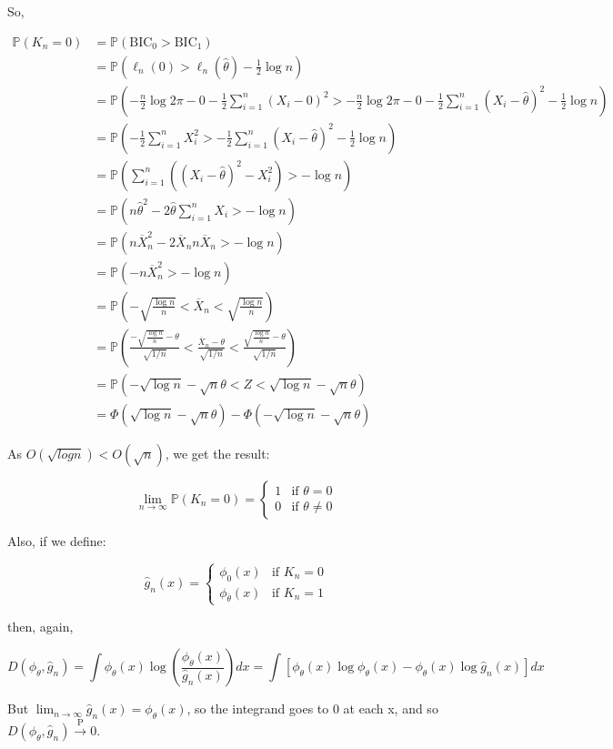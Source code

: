 So,

\begin{align}
\mathbb{P}(K_n = 0) &= \mathbb{P}(\text{BIC}_0 > \text{BIC}_1) \\
&= \mathbb{P}\left(\ell_n(0) > \ell_n(\hat{\theta}) - \frac{1}{2} \log n \right) \\
&= \mathbb{P} \left(-\frac{n}{2} \log 2\pi - 0 - \frac{1}{2} \sum_{i=1}^n (X_i - 0)^2 > -\frac{n}{2} \log 2\pi - 0 - \frac{1}{2} \sum_{i=1}^n (X_i - \hat{\theta})^2 - \frac{1}{2} \log n \right) \\
&= \mathbb{P}\left( -\frac{1}{2} \sum_{i=1}^n X_i^2 > -\frac{1}{2} \sum_{i=1}^n (X_i - \hat{\theta})^2 - \frac{1}{2} \log n\right) \\
&= \mathbb{P}\left( \sum_{i=1}^n \left((X_i - \hat{\theta})^2 - X_i^2 \right) > -\log n \right) \\
&= \mathbb{P}\left( n \hat{\theta}^2 - 2 \hat{\theta} \sum_{i=1}^n X_i > -\log n \right) \\
&= \mathbb{P}\left( n \overline{X}_n^2 - 2 \overline{X}_n n \overline{X}_n > -\log n\right) \\
&= \mathbb{P}\left( -n \overline{X}_n^2 > -\log n \right) \\
&= \mathbb{P}\left(-\sqrt{\frac{\log n}{n}} < \overline{X}_n < \sqrt{\frac{\log n}{n}} \right) \\
&= \mathbb{P}\left(\frac{-\sqrt{\frac{\log n}{n}} - \theta}{\sqrt{1/n}} < \frac{\overline{X}_n - \theta}{\sqrt{1/n}} < \frac{\sqrt{\frac{\log n}{n}} - \theta}{\sqrt{1/n}} \right) \\ 
&=  \mathbb{P}\left(-\sqrt{\log n} - \sqrt{n}\theta < Z < \sqrt{\log n} - \sqrt{n}\theta \right) \\
&= \Phi(\sqrt{\log n} - \sqrt{n}\theta) - \Phi(-\sqrt{\log n} - \sqrt{n}\theta)
\end{align}

As \(O(\sqrt{log n}) < O(\sqrt{n})\), we get the result:

\[ \lim_{n \rightarrow \infty} \mathbb{P}(K_n = 0) = \begin{cases}
1 & \text{if } \theta = 0 \\
0 & \text{if } \theta \neq 0
\end{cases}\]

Also, if we define:

\[\hat{g}_n(x) = \begin{cases}
\phi_0(x) & \text{if } K_n = 0 \\
\phi_\overline{\theta}(x) & \text{if } K_n = 1
\end{cases}\]

then, again,

\[ D(\phi_\theta, \hat{g}_n) = \int \phi_\theta(x) \log \left(\frac{\phi_\theta(x)}{\hat{g}_n(x)} \right) dx = \int \left[\phi_\theta(x) \log \phi_\theta(x) - \phi_\theta(x) \log \hat{g}_n(x) \right] dx \]

But \(\lim_{n \rightarrow \infty} \hat{g}_n(x) = \phi_\theta(x)\), so
the integrand goes to 0 at each x, and so
\(D(\phi_\theta, \hat{g}_n) \xrightarrow{\text{P}} 0\).
